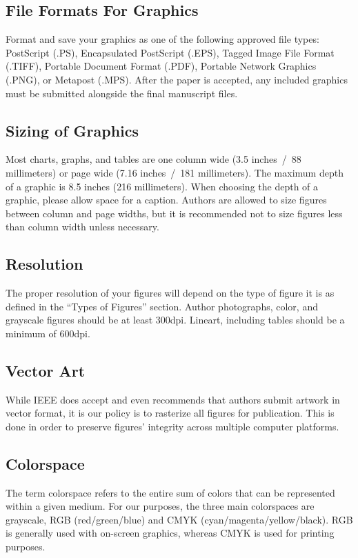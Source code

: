 \documentclass[journal,twoside,web]{ieeecolor}
\begin{document}
\subsection{File Formats For Graphics}
\label{formats}
Format and save your graphics as one of the following approved file types:
PostScript (.PS), Encapsulated PostScript (.EPS), Tagged Image File Format (.TIFF),
Portable Document Format (.PDF), Portable Network Graphics (.PNG), or Metapost (.MPS).
After the paper is accepted, any included graphics must be submitted alongside the final manuscript files.

\subsection{Sizing of Graphics}
Most charts, graphs, and tables are one column wide (3.5 inches~/~88
millimeters) or page wide (7.16 inches~/~181 millimeters). The maximum
depth of a graphic is 8.5 inches (216 millimeters). When choosing the depth of a graphic,
please allow space for a caption. Authors are allowed to size figures between column and
page widths, but it is recommended not to size figures less than column width unless necessary.

\subsection{Resolution}
The proper resolution of your figures will depend on the type of figure it
is as defined in the ``Types of Figures'' section. Author photographs,
color, and grayscale figures should be at least 300dpi. Lineart, including
tables should be a minimum of 600dpi.

\subsection{Vector Art}
While IEEE does accept and even recommends that authors submit artwork
in vector format, it is our policy is to rasterize all figures for publication. This is done
in order to preserve figures' integrity across multiple computer platforms.

\subsection{Colorspace}
The term colorspace refers to the entire sum of colors that can be
represented within a given medium. For our purposes, the three main colorspaces
are grayscale, RGB (red/green/blue) and CMYK (cyan/magenta/yellow/black).
RGB is generally used with on-screen graphics, whereas CMYK is used for printing purposes.
\end{document}
